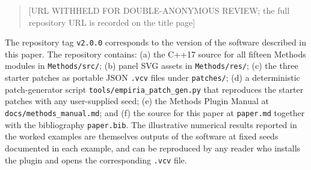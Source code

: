 \begin{quote}
{[}URL WITHHELD FOR DOUBLE-ANONYMOUS REVIEW; the full repository URL is
recorded on the title page{]}
\end{quote}

The repository tag \texttt{v2.0.0} corresponds to the version of the
software described in this paper. The repository contains: (a) the C++17
source for all fifteen Methods modules in \texttt{Methods/src/}; (b)
panel SVG assets in \texttt{Methods/res/}; (c) the three starter patches
as portable JSON \texttt{.vcv} files under \texttt{patches/}; (d) a
deterministic patch-generator script
\texttt{tools/empiria\_patch\_gen.py} that reproduces the starter
patches with any user-supplied seed; (e) the Methods Plugin Manual at
\texttt{docs/methods\_manual.md}; and (f) the source for this paper at
\texttt{paper.md} together with the bibliography \texttt{paper.bib}. The
illustrative numerical results reported in the worked examples are
themselves outputs of the software at fixed seeds documented in each
example, and can be reproduced by any reader who installs the plugin and
opens the corresponding \texttt{.vcv} file.

